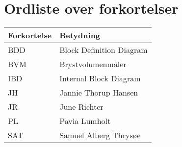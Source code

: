 \section{Ordliste over forkortelser}

\vspace{1cm}
\begin{table}[hbt]
\centering
\label{ordliste}
\begin{tabular}{|l|l|}
\hline
\textbf{Forkortelse             } & \textbf{Betydning             } \\ \hline
BDD & Block Definition Diagram \\ \hline
BVM & Brystvolumenmåler \\ \hline
IBD & Internal Block Diagram \\ \hline 
JH & Jannie Thorup Hansen \\ \hline
JR & June Richter  \\ \hline
PL & Pavia Lumholt \\ \hline
SAT & Samuel Alberg Thrysøe \\ \hline
\end{tabular}
\end{table}
